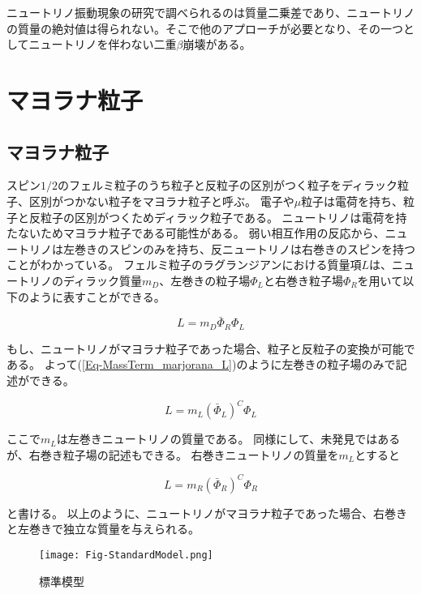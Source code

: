 \documentclass[a4paper,10pt]{jreport}
\begin{document}
ニュートリノ振動現象の研究で調べられるのは質量二乗差であり、ニュートリノの質量の絶対値は得られない。そこで他のアプローチが必要となり、その一つとしてニュートリノを伴わない二重$\beta$崩壊がある。




\section{マヨラナ粒子}




\subsection{マヨラナ粒子}

スピン$1/2$のフェルミ粒子のうち粒子と反粒子の区別がつく粒子をディラック粒子、区別がつかない粒子をマヨラナ粒子と呼ぶ。
電子や$\mu$粒子は電荷を持ち、粒子と反粒子の区別がつくためディラック粒子である。
ニュートリノは電荷を持たないためマヨラナ粒子である可能性がある。
弱い相互作用の反応から、ニュートリノは左巻きのスピンのみを持ち、反ニュートリノは右巻きのスピンを持つことがわかっている。
フェルミ粒子のラグランジアンにおける質量項$L$は、ニュートリノのディラック質量$m_D$、左巻きの粒子場$\Phi_L$と右巻き粒子場$\Phi_R$を用いて以下のように表すことができる。

\begin{equation} \label{Eq-MassTerm_fermi}
	L=m_D\bar{\Phi}_R\Phi_L
\end{equation}

もし、ニュートリノがマヨラナ粒子であった場合、粒子と反粒子の変換が可能である。
よって(\ref{Eq-MassTerm_marjorana_L})のように左巻きの粒子場のみで記述ができる。

\begin{equation} \label{Eq-MassTerm_marjorana_L}
	L=m_L(\bar{\Phi}_L)^C\Phi_L
\end{equation}

ここで$m_L$は左巻きニュートリノの質量である。
同様にして、未発見ではあるが、右巻き粒子場の記述もできる。
右巻きニュートリノの質量を$m_L$とすると

\begin{equation} \label{Eq-MassTerm_marjorana_R}
	L=m_R(\bar{\Phi}_R)^C\Phi_R
\end{equation}

と書ける。
以上のように、ニュートリノがマヨラナ粒子であった場合、右巻きと左巻きで独立な質量を与えられる。

\begin{figure}[H]
	\center
	\texttt{[image: Fig-StandardModel.png]}
	\caption{標準模型} \label{Fig-StandardModel}
\end{figure}
\end{document}
